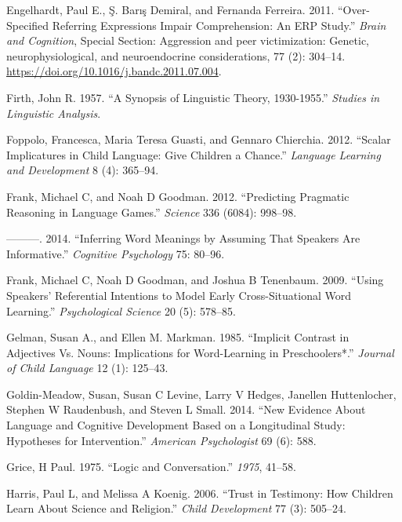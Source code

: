 \documentclass{ucetd}
\newlength{\cslhangindent}
\newenvironment{cslreferences}%
{\setlength{\parindent}{0pt}%
\everypar{\setlength{\hangindent}{\cslhangindent}}\ignorespaces}%
{\par}
\begin{document}
\begin{cslreferences}
\leavevmode\hypertarget{ref-engelhardt_over-specified_2011}{}%
Engelhardt, Paul E., Ş. Barış Demiral, and Fernanda Ferreira. 2011.
``Over-Specified Referring Expressions Impair Comprehension: An ERP
Study.'' \emph{Brain and Cognition}, Special Section: Aggression and
peer victimization: Genetic, neurophysiological, and neuroendocrine
considerations, 77 (2): 304--14.
\url{https://doi.org/10.1016/j.bandc.2011.07.004}.

\leavevmode\hypertarget{ref-firth1957}{}%
Firth, John R. 1957. ``A Synopsis of Linguistic Theory, 1930-1955.''
\emph{Studies in Linguistic Analysis}.

\leavevmode\hypertarget{ref-foppolo_scalar_2012}{}%
Foppolo, Francesca, Maria Teresa Guasti, and Gennaro Chierchia. 2012.
``Scalar Implicatures in Child Language: Give Children a Chance.''
\emph{Language Learning and Development} 8 (4): 365--94.

\leavevmode\hypertarget{ref-frank2012}{}%
Frank, Michael C, and Noah D Goodman. 2012. ``Predicting Pragmatic
Reasoning in Language Games.'' \emph{Science} 336 (6084): 998--98.

\leavevmode\hypertarget{ref-frank2014}{}%
---------. 2014. ``Inferring Word Meanings by Assuming That Speakers Are
Informative.'' \emph{Cognitive Psychology} 75: 80--96.

\leavevmode\hypertarget{ref-frank2009}{}%
Frank, Michael C, Noah D Goodman, and Joshua B Tenenbaum. 2009. ``Using
Speakers' Referential Intentions to Model Early Cross-Situational Word
Learning.'' \emph{Psychological Science} 20 (5): 578--85.

\leavevmode\hypertarget{ref-gelman_implicit_1985}{}%
Gelman, Susan A., and Ellen M. Markman. 1985. ``Implicit Contrast in
Adjectives Vs. Nouns: Implications for Word-Learning in Preschoolers*.''
\emph{Journal of Child Language} 12 (1): 125--43.

\leavevmode\hypertarget{ref-goldin-meadow2014}{}%
Goldin-Meadow, Susan, Susan C Levine, Larry V Hedges, Janellen
Huttenlocher, Stephen W Raudenbush, and Steven L Small. 2014. ``New
Evidence About Language and Cognitive Development Based on a
Longitudinal Study: Hypotheses for Intervention.'' \emph{American
Psychologist} 69 (6): 588.

\leavevmode\hypertarget{ref-grice1975logic}{}%
Grice, H Paul. 1975. ``Logic and Conversation.'' \emph{1975}, 41--58.

\leavevmode\hypertarget{ref-harris2006}{}%
Harris, Paul L, and Melissa A Koenig. 2006. ``Trust in Testimony: How
Children Learn About Science and Religion.'' \emph{Child Development} 77
(3): 505--24.


\end{cslreferences}
\end{document}
